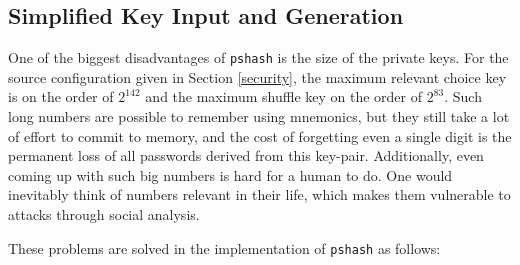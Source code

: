 \documentclass[a4paper, 10pt]{article}
\theoremstyle{plain}
\theoremstyle{definition}
\begin{document}
\subsection{Simplified Key Input and Generation} \label{input}

One of the biggest disadvantages of \texttt{pshash} is the size of the private keys. For the source configuration given in Section \ref{security}, the maximum relevant choice key is on the order of $2^{142}$ and the maximum shuffle key on the order of $2^{83}$. Such long numbers are possible to remember using mnemonics, but they still take a lot of effort to commit to memory, and the cost of forgetting even a single digit is the permanent loss of all passwords derived from this key-pair. Additionally, even coming up with such big numbers is hard for a human to do. One would inevitably think of numbers relevant in their life, which makes them vulnerable to attacks through social analysis.

These problems are solved in the implementation of \texttt{pshash} as follows:
\end{document}
